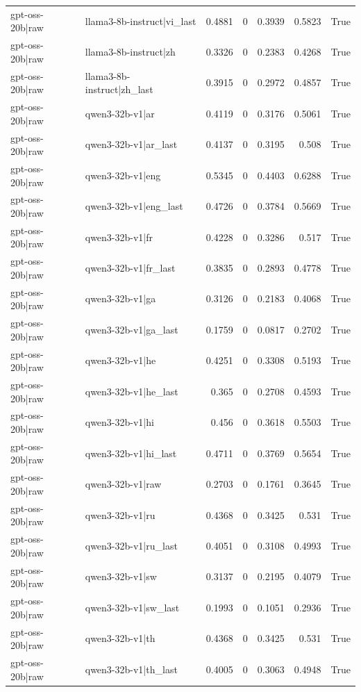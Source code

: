\begin{table}
\begin{tabular}{l l r r r r l}
gpt-oss-20b|raw & llama3-8b-instruct|vi_last & 0.4881 & 0 & 0.3939 & 0.5823 & True \\
gpt-oss-20b|raw & llama3-8b-instruct|zh & 0.3326 & 0 & 0.2383 & 0.4268 & True \\
gpt-oss-20b|raw & llama3-8b-instruct|zh_last & 0.3915 & 0 & 0.2972 & 0.4857 & True \\
gpt-oss-20b|raw & qwen3-32b-v1|ar & 0.4119 & 0 & 0.3176 & 0.5061 & True \\
gpt-oss-20b|raw & qwen3-32b-v1|ar_last & 0.4137 & 0 & 0.3195 & 0.508 & True \\
gpt-oss-20b|raw & qwen3-32b-v1|eng & 0.5345 & 0 & 0.4403 & 0.6288 & True \\
gpt-oss-20b|raw & qwen3-32b-v1|eng_last & 0.4726 & 0 & 0.3784 & 0.5669 & True \\
gpt-oss-20b|raw & qwen3-32b-v1|fr & 0.4228 & 0 & 0.3286 & 0.517 & True \\
gpt-oss-20b|raw & qwen3-32b-v1|fr_last & 0.3835 & 0 & 0.2893 & 0.4778 & True \\
gpt-oss-20b|raw & qwen3-32b-v1|ga & 0.3126 & 0 & 0.2183 & 0.4068 & True \\
gpt-oss-20b|raw & qwen3-32b-v1|ga_last & 0.1759 & 0 & 0.0817 & 0.2702 & True \\
gpt-oss-20b|raw & qwen3-32b-v1|he & 0.4251 & 0 & 0.3308 & 0.5193 & True \\
gpt-oss-20b|raw & qwen3-32b-v1|he_last & 0.365 & 0 & 0.2708 & 0.4593 & True \\
gpt-oss-20b|raw & qwen3-32b-v1|hi & 0.456 & 0 & 0.3618 & 0.5503 & True \\
gpt-oss-20b|raw & qwen3-32b-v1|hi_last & 0.4711 & 0 & 0.3769 & 0.5654 & True \\
gpt-oss-20b|raw & qwen3-32b-v1|raw & 0.2703 & 0 & 0.1761 & 0.3645 & True \\
gpt-oss-20b|raw & qwen3-32b-v1|ru & 0.4368 & 0 & 0.3425 & 0.531 & True \\
gpt-oss-20b|raw & qwen3-32b-v1|ru_last & 0.4051 & 0 & 0.3108 & 0.4993 & True \\
gpt-oss-20b|raw & qwen3-32b-v1|sw & 0.3137 & 0 & 0.2195 & 0.4079 & True \\
gpt-oss-20b|raw & qwen3-32b-v1|sw_last & 0.1993 & 0 & 0.1051 & 0.2936 & True \\
gpt-oss-20b|raw & qwen3-32b-v1|th & 0.4368 & 0 & 0.3425 & 0.531 & True \\
gpt-oss-20b|raw & qwen3-32b-v1|th_last & 0.4005 & 0 & 0.3063 & 0.4948 & True \\

\end{tabular}
\end{table}
